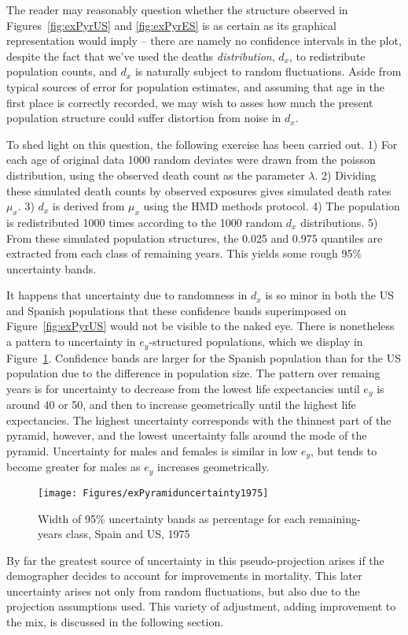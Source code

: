 \FloatBarrier
\label{sec:structuncertainty}
The reader may reasonably question whether the structure observed in
Figures~\ref{fig:exPyrUS} and \ref{fig:exPyrES} is as certain as its graphical
representation would imply -- there are namely no confidence intervals in the
plot, despite the fact that we've used the deaths \textit{distribution}, $d_x$,
to redistribute population counts, and $d_x$ is naturally subject to random
fluctuations. Aside from typical sources of error for population estimates, and
assuming that age in the first place is correctly recorded, we may wish to asses
how much the present population structure could suffer distortion from noise in
$d_x$. 

To shed light on this question, the following exercise has been
carried out. 1) For each age of original data 1000 random deviates were drawn
from the poisson distribution, using the observed death count as the parameter
$\lambda$. 2) Dividing these simulated death counts by observed exposures gives
simulated death rates $\mu_x$. 3) $d_x$ is derived from $\mu_x$ using the HMD
methods protocol. 4) The population is redistributed 1000 times according to the
1000 random $d_x$ distributions. 5) From these simulated population structures,
the 0.025 and 0.975 quantiles are extracted from each class of remaining years.
This yields some rough 95\% uncertainty bands.

It happens that uncertainty due to randomness in $d_x$ is so minor in both the
US and Spanish populations that these confidence bands superimposed on
Figure~\ref{fig:exPyrUS} would not be visible to the naked eye. There is
nonetheless a pattern to uncertainty in $e_y$-structured populations, 
which we display in Figure~\ref{fig:PyramidUncertainty}. Confidence bands are
larger for the Spanish population than for the US population due to
the difference in population size. The pattern over remaing years is for
uncertainty to decrease from the lowest life expectancies until $e_y$ is around 40 or 50, and then to
increase geometrically until the highest life expectancies. The highest
uncertainty corresponds with the thinnest part of the pyramid, however, and the
lowest uncertainty falls around the mode of the pyramid. Uncertainty for males
and females is similar in low $e_y$, but tends to become greater for males as
$e_y$ increases geometrically.

\begin{figure}
      \centering
      \caption{Width of 95\% uncertainty bands as percentage for each
      remaining-years class, Spain and US, 1975}
         \texttt{[image: Figures/exPyramiduncertainty1975]}
      \label{fig:PyramidUncertainty} 
\end{figure}

By far the greatest source of uncertainty in this
pseudo-projection arises if the demographer decides to account for
improvements in mortality. This later uncertainty arises not only from
random fluctuations, but also due to the projection assumptions used. This
variety of adjustment, adding improvement to the mix, is discussed in the
following section.

\FloatBarrier